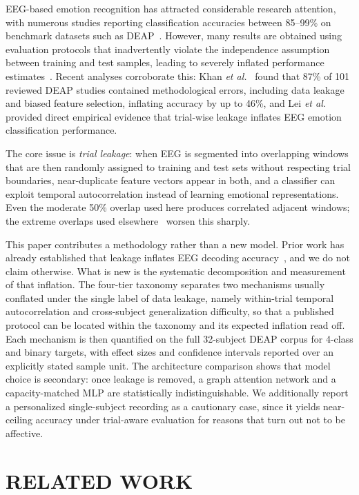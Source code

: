 \documentclass[conference,a4paper]{IEEEtran}
\begin{document}
EEG-based emotion recognition has attracted considerable research attention, with numerous studies reporting classification accuracies between 85--99\% on benchmark datasets such as DEAP~\cite{koelstra2012}. However, many results are obtained using evaluation protocols that inadvertently violate the independence assumption between training and test samples, leading to severely inflated performance estimates~\cite{varoquaux2017, roberts2017}. Recent analyses corroborate this: Khan \textit{et al.}~\cite{khan2025} found that 87\% of 101 reviewed DEAP studies contained methodological errors, including data leakage and biased feature selection, inflating accuracy by up to 46\%, and Lei \textit{et al.}~\cite{lei2025} provided direct empirical evidence that trial-wise leakage inflates EEG emotion classification performance.

The core issue is \emph{trial leakage}: when EEG is segmented into overlapping windows that are then randomly assigned to training and test sets without respecting trial boundaries, near-duplicate feature vectors appear in both, and a classifier can exploit temporal autocorrelation instead of learning emotional representations. Even the moderate 50\% overlap used here produces correlated adjacent windows; the extreme overlaps used elsewhere~\cite{craik2019} worsen this sharply.

This paper contributes a methodology rather than a new model. Prior work has already established that leakage inflates EEG decoding accuracy~\cite{varoquaux2017, khan2025, lei2025}, and we do not claim otherwise. What is new is the systematic decomposition and measurement of that inflation. The four-tier taxonomy separates two mechanisms usually conflated under the single label of data leakage, namely within-trial temporal autocorrelation and cross-subject generalization difficulty, so that a published protocol can be located within the taxonomy and its expected inflation read off. Each mechanism is then quantified on the full 32-subject DEAP corpus for 4-class and binary targets, with effect sizes and confidence intervals reported over an explicitly stated sample unit. The architecture comparison shows that model choice is secondary: once leakage is removed, a graph attention network and a capacity-matched MLP are statistically indistinguishable. We additionally report a personalized single-subject recording as a cautionary case, since it yields near-ceiling accuracy under trial-aware evaluation for reasons that turn out not to be affective.

\section{RELATED WORK}
\end{document}

